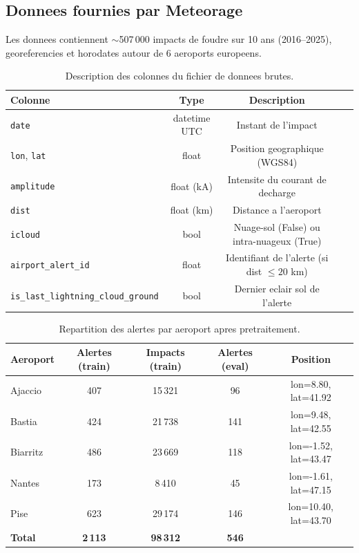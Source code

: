 \documentclass[a4paper,11pt]{article}
\begin{document}
\subsection{Donnees fournies par Meteorage}

Les donnees contiennent $\sim$507\,000 impacts de foudre sur 10 ans
(2016--2025), georeferencies et horodates autour de 6 aeroports europeens.

\begin{table}[H]
\centering
\begin{tabular}{lcccc}
\toprule
Colonne & Type & Description \\
\midrule
\texttt{date} & datetime UTC & Instant de l'impact \\
\texttt{lon}, \texttt{lat} & float & Position geographique (WGS84) \\
\texttt{amplitude} & float (kA) & Intensite du courant de decharge \\
\texttt{dist} & float (km) & Distance a l'aeroport \\
\texttt{icloud} & bool & Nuage-sol (False) ou intra-nuageux (True) \\
\texttt{airport\_alert\_id} & float & Identifiant de l'alerte (si dist $\leq 20$ km) \\
\texttt{is\_last\_lightning\_cloud\_ground} & bool & Dernier eclair sol de l'alerte \\
\bottomrule
\end{tabular}
\caption{Description des colonnes du fichier de donnees brutes.}
\end{table}

\begin{table}[H]
\centering
\begin{tabular}{lcccc}
\toprule
Aeroport & Alertes (train) & Impacts (train) & Alertes (eval) & Position \\
\midrule
Ajaccio  & 407 & 15\,321 & 96  & lon=8.80,  lat=41.92 \\
Bastia   & 424 & 21\,738 & 141 & lon=9.48,  lat=42.55 \\
Biarritz & 486 & 23\,669 & 118 & lon=-1.52, lat=43.47 \\
Nantes   & 173 & 8\,410  & 45  & lon=-1.61, lat=47.15 \\
Pise     & 623 & 29\,174 & 146 & lon=10.40, lat=43.70 \\
\midrule
\textbf{Total} & \textbf{2\,113} & \textbf{98\,312} & \textbf{546} & \\
\bottomrule
\end{tabular}
\caption{Repartition des alertes par aeroport apres pretraitement.}
\end{table}
\end{document}
